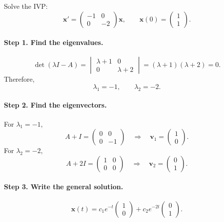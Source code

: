 \documentclass[10pt,letterpaper]{article}
\begin{document}
\begin{example}[1]{
Solve the IVP:
\[
\mathbf{x}'=
\begin{pmatrix}
-1&0\\
0&-2
\end{pmatrix}\mathbf{x},
\qquad
\mathbf{x}(0)=\begin{pmatrix}1\\1\end{pmatrix}.
\]
}

\paragraph{Step 1. Find the eigenvalues.}
\[
\det(\lambda I-A)
=
\begin{vmatrix}
\lambda+1&0\\
0&\lambda+2
\end{vmatrix}
=(\lambda+1)(\lambda+2)=0.
\]
Therefore,
\[
\lambda_1=-1,\qquad \lambda_2=-2.
\]

\paragraph{Step 2. Find the eigenvectors.}
For $\lambda_1=-1$,
\[
A+I=
\begin{pmatrix}
0&0\\
0&-1
\end{pmatrix}
\quad\Longrightarrow\quad
\mathbf{v}_1=\begin{pmatrix}1\\0\end{pmatrix}.
\]
For $\lambda_2=-2$,
\[
A+2I=
\begin{pmatrix}
1&0\\
0&0
\end{pmatrix}
\quad\Longrightarrow\quad
\mathbf{v}_2=\begin{pmatrix}0\\1\end{pmatrix}.
\]

\paragraph{Step 3. Write the general solution.}
\[
\mathbf{x}(t)
=c_1e^{-t}\begin{pmatrix}1\\0\end{pmatrix}
+c_2e^{-2t}\begin{pmatrix}0\\1\end{pmatrix}.
\]


\end{example}
\end{document}
